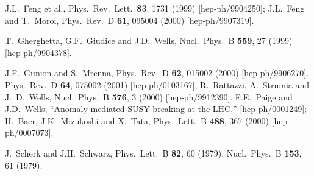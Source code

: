 \documentclass[12pt]{article}
\begin{document}
\begin{thebibliography}{999}
J.L.~Feng et al.,
  Phys.\ Rev.\ Lett.\  {\bf 83}, 1731 (1999)
  [hep-ph/9904250];
J.L.~Feng and T.~Moroi,
  Phys.\ Rev.\ D {\bf 61}, 095004 (2000)
  [hep-ph/9907319].

T.~Gherghetta, G.F.~Giudice and J.D.~Wells,
  Nucl.\ Phys.\ B {\bf 559}, 27 (1999)
  [hep-ph/9904378].

J.F.~Gunion and S.~Mrenna,
  Phys.\ Rev.\ D {\bf 62}, 015002 (2000)
  [hep-ph/9906270].
  Phys.\ Rev.\ D {\bf 64}, 075002 (2001)
  [hep-ph/0103167],
R.~Rattazzi, A.~Strumia and J.~D.~Wells,
  Nucl.\ Phys.\ B {\bf 576}, 3 (2000)
  [hep-ph/9912390].
F.E.~Paige and J.D.~Wells,
  ``Anomaly mediated SUSY breaking at the LHC,''
  [hep-ph/0001249];
H.~Baer, J.K.~Mizukoshi and X.~Tata,
  Phys.\ Lett.\ B {\bf 488}, 367 (2000)
  [hep-ph/0007073].

J.~Scherk and J.H.~Schwarz,
  Phys.\ Lett.\ B {\bf 82}, 60 (1979);
  Nucl.\ Phys.\ B {\bf 153}, 61 (1979).


\end{thebibliography}
\end{document}
